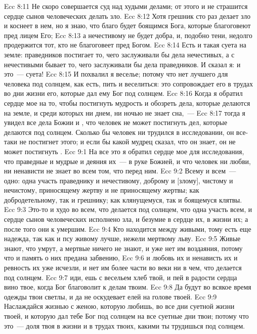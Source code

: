 \vs Ecc 8:11 Не скоро совершается суд над худыми делами; от этого и не страшится сердце сынов человеческих делать зло.
\vs Ecc 8:12 Хотя грешник сто раз делает зло и коснеет в нем, но я знаю, что благо будет боящимся Бога, которые благоговеют пред лицем Его;
\vs Ecc 8:13 а нечестивому не будет добра, и, подобно тени, недолго продержится тот, кто не благоговеет пред Богом.
\vs Ecc 8:14 Есть и такая суета на земле: праведников постигает то, чего заслуживали бы дела нечестивых, а с нечестивыми бывает то, чего заслуживали бы дела праведников. И сказал я: и это~--- суета!
\vs Ecc 8:15 И похвалил я веселье; потому что нет лучшего для человека под солнцем, как есть, пить и веселиться: это сопровождает его в трудах во дни жизни его, которые дал ему Бог под солнцем.
\rsbpar\vs Ecc 8:16 Когда я обратил сердце мое на то, чтобы постигнуть мудрость и обозреть дела, которые делаются на земле, и среди которых  ни днем, ни ночью не знает сна,~---
\vs Ecc 8:17 тогда я увидел все дела Божии и , что человек не может постигнуть дел, которые делаются под солнцем. Сколько бы человек ни трудился в исследовании, он все-таки не постигнет этого; и если бы какой мудрец сказал, что он знает, он не может постигнуть .
\vs Ecc 9:1 На все это я обратил сердце мое для исследования, что праведные и мудрые и деяния их~--- в руке Божией, и что человек ни любви, ни ненависти не знает во всем том, что перед ним.
\vs Ecc 9:2 Всему и всем~--- одно: одна участь праведнику и нечестивому, доброму и [злому], чистому и нечистому, приносящему жертву и не приносящему жертвы; как добродетельному, так и грешнику; как клянущемуся, так и боящемуся клятвы.
\vs Ecc 9:3 Это-то и худо во всем, что делается под солнцем, что одна участь всем, и сердце сынов человеческих исполнено зла, и безумие в сердце их, в жизни их; а после того они  к умершим.
\vs Ecc 9:4 Кто находится между живыми, тому есть еще надежда, так как и псу живому лучше, нежели мертвому льву.
\vs Ecc 9:5 Живые знают, что умрут, а мертвые ничего не знают, и уже нет им воздаяния, потому что и память о них предана забвению,
\vs Ecc 9:6 и любовь их и ненависть их и ревность их уже исчезли, и нет им более части во веки ни в чем, что делается под солнцем.
\vs Ecc 9:7  иди, ешь с весельем хлеб твой, и пей в радости сердца вино твое, когда Бог благоволит к делам твоим.
\vs Ecc 9:8 Да будут во всякое время одежды твои светлы, и да не оскудевает елей на голове твоей.
\vs Ecc 9:9 Наслаждайся жизнью с женою, которую любишь, во все дни суетной жизни твоей, и которую дал тебе Бог под солнцем на все суетные дни твои; потому что это~--- доля твоя в жизни и в трудах твоих, какими ты трудишься под солнцем.
